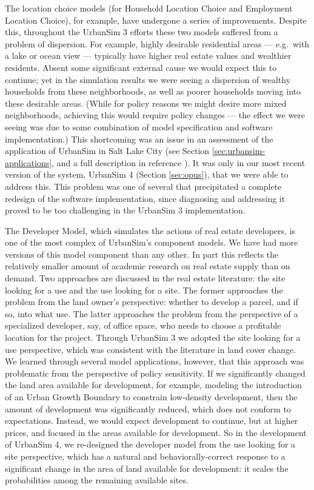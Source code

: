The location choice models (for Household Location Choice and
Employment Location Choice), for example, have undergone a series
of improvements. Despite this, throughout the UrbanSim 3 efforts
these two models suffered from a problem of dispersion. For
example, highly desirable residential areas
--- e.g.\ with a lake or ocean view --- typically have higher real estate
values and wealthier residents.  Absent some significant external
cause we would expect this to continue; yet in the simulation
results we were seeing a dispersion of wealthy households from
these neighborhoods, as well as poorer households moving into
these desirable areas. (While for policy reasons we might desire
more mixed neighborhoods, achieving this would require policy
changes
--- the effect we were seeing was due to some combination of model 
specification and software implementation.)
This shortcoming was an issue in an assessment of the application
of UrbanSim in Salt Lake City (see Section
\ref{sec:urbansim-applications}, and a full description in reference
\cite{waddell-wfrc-2006}). It was only in our most recent version
of the system, UrbanSim 4 (Section \ref{sec:opus}), that we were able to
address this. This problem was one of several that precipitated a
complete redesign of the software implementation, since diagnosing
and addressing it proved to be too challenging in the UrbanSim 3
implementation.

The Developer Model, which simulates the actions of real estate
developers, is one of the most complex of UrbanSim's component
models.  We have had more versions of this model component than
any other.  In part this reflects the relatively smaller amount of
academic research on real estate supply than on demand.
Two approaches are discussed in the real estate
literature: the site looking for a use and the use looking for a
site.  The former approaches the problem from the land owner's
perspective: whether to develop a parcel, and if so, into what
use.  The latter approaches the problem from the perspective of a
specialized developer, say, of office space, who needs to choose a
profitable location for the project.  Through UrbanSim 3 we
adopted the site looking for a use perspective, which was
consistent with the literature in land cover change. We learned
through several model applications, however, that this approach
was problematic from the perspective of policy sensitivity.  If we
significantly changed the land area available for development, for
example, modeling the introduction of an Urban Growth Boundary to
constrain low-density development, then the amount of development
was significantly reduced, which does not conform to expectations.
Instead, we would expect development to continue, but at higher
prices, and focused in the areas available for development.  So in
the development of UrbanSim 4, we re-designed the developer model
from the use looking for a site perspective, which has a natural
and behaviorally-correct response to a significant change in the
area of land available for development: it scales the
probabilities among the remaining available sites.


